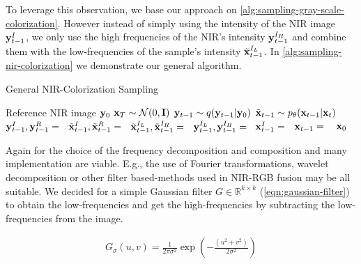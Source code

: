 To leverage this observation, we base our approach on \autoref{alg:sampling-gray-scale-colorization}.
However instead of simply using the intensity of the NIR image $\mathbf{y}_{t-1}^I$, we only use the high frequencies of the NIR's intensity $\mathbf{y}_{t-1}^{I_H}$
and combine them with the low-frequencies of the sample's intensity $\tilde{\mathbf{x}}_{t-1}^{I_L}$.
In \autoref{alg:sampling-nir-colorization} we demonstrate our general algorithm.

\begin{algorithm}[htp!]
   \caption{General NIR-Colorization Sampling}
   \label{alg:sampling-nir-colorization}
   \begin{algorithmic}
      \Require Reference NIR image $\mathbf{y}_0$
      \State $\mathbf{x}_T \sim \mathcal{N}(0, \mathbf{I})$
      \State $\mathbf{y}_{t-1} \sim q(\mathbf{y}_{t-1}| \mathbf{y}_0)$
      \State $\tilde{\mathbf{x}}_{t-1} \sim p_\theta(\mathbf{x}_{t-1}|\mathbf{x}_t)$
      \State $\mathbf{y}_{t-1}^I, \mathbf{y}_{t-1}^R = $\ 
      \State $\tilde{\mathbf{x}}_{t-1}^I, \tilde{\mathbf{x}}_{t-1}^R=$\ 
      \State $\tilde{\mathbf{x}}_{t-1}^{I_L}, \tilde{\mathbf{x}}_{t-1}^{I_H} =$\ 
      \State $\mathbf{y}_{t-1}^{I_L}, \mathbf{y}_{t-1}^{I_H} =$\ 
      \State $\mathbf{x}_{t-1}^I =$\ 
      \State $\mathbf{x}_{t-1}=$ \ 
      \EndFor
      \Return $\mathbf{x}_0$
   \end{algorithmic}
\end{algorithm}

Again for the choice of the frequency decomposition and composition  and 
many implementation are viable.
E.g., the use of Fourier transformations, wavelet decomposition or other filter based-methods used in NIR-RGB fusion \parencite{study-vis-nir-fusion} may be all suitable.
We decided for a simple Gaussian filter $G \in \mathbb{R}^{k \times k}$ (\autoref{eqn:gaussian-filter}) to obtain the low-frequencies \parencite{computer-vision-a-modern-approach} and get the high-frequencies by subtracting the low-frequencies from the image.

\begin{equation}
   \label{eqn:gaussian-filter}
   \begin{aligned}
      G_{\sigma}(u,v) = \frac{1}{2 \pi \sigma^2} \exp\left(-\frac{(u^2+ v^2)}{2\sigma^2}\right) \\
   \end{aligned}
\end{equation}

